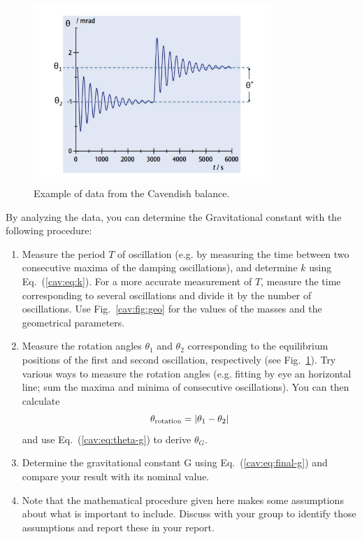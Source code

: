 \begin{figure}
	\centering
	\includegraphics[width=0.8\textwidth]{cavendish/tel-rp2111-example-data}
	\caption{Example of data from the Cavendish balance.}\label{cav:fig:data}
\end{figure}

By analyzing the data, you can determine the Gravitational constant with the following
procedure:
\begin{enumerate}
	\item Measure the period $T$ of oscillation (e.g. by measuring the time between two
	consecutive maxima of the damping oscillations), and determine $k$ using Eq.~(\ref{cav:eq:k}). For a more
	accurate measurement of $T$, measure the time corresponding to several
	oscillations and divide it by the number of oscillations. Use Fig.~\ref{cav:fig:geo} for the values
	of the masses and the geometrical parameters.
	
	\item Measure the rotation angles $\theta_1$ and $\theta_2$ corresponding to the equilibrium positions
	of the first and second oscillation, respectively (see Fig.~\ref{cav:fig:data}). Try various ways to measure the rotation angles (e.g. fitting by eye an horizontal line; sum the
	maxima and minima of consecutive oscillations). You can then calculate
	\begin{equation}
	\theta_\textrm{rotation} = \left\lvert\theta_1 - \theta_2\right\rvert
	\end{equation}
	and use Eq.~(\ref{cav:eq:theta-g}) to derive $\theta_G$.
	
	\item Determine the gravitational constant G using Eq.~(\ref{cav:eq:final-g}) and compare your result with its nominal value.
	
	\item Note that the mathematical procedure given here makes some assumptions about what is important to include. Discuss with your group to identify those assumptions and report these in your report.
\end{enumerate}

